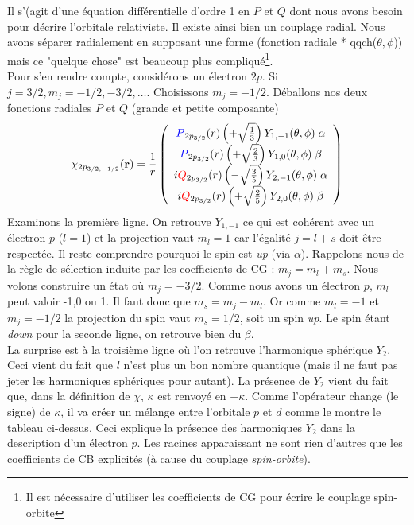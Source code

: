 Il s'(agit d'une équation différentielle d'ordre 1 en $P$ et $Q$ dont nous avons besoin pour
décrire l'orbitale relativiste. Il existe ainsi bien un couplage radial. Nous avons séparer radialement en supposant une forme (fonction radiale * qqch($\theta,\phi$)) mais ce "quelque chose"
est beaucoup plus compliqué\footnote{Il est nécessaire d'utiliser les coefficients de CG pour écrire
le couplage spin-orbite}.\\
 
Pour s'en rendre compte, considérons un électron $2p$. Si $j=3/2, m_j = -1/2,-3/2,\dots$. Choisissons
$m_j = -1/2$. Déballons nos deux fonctions radiales $P$ et $Q$ (grande et petite composante)
\begin{equation}
\chi_{2p_{{3/2}, -1/2}} ({\bf r}) =\frac{1}{r} \left( \begin{array}{c}
 {\color{blue} P}_{2p_{3/2} }(r) \left(   +\sqrt{\frac{1}{3} } \right) Y_{1,-1} (\theta, \phi)\;  \alpha \\ 
 {\color{blue} P}_{2p_{3/2} }(r) \left(   +\sqrt{\frac{2}{3} } \right) Y_{1,0} (\theta, \phi)\;  \beta \\ 
 i {\color{red} Q}_{2p_{3/2} } (r) \left(   -\sqrt{\frac{3}{5} } \right) Y_{2,-1} (\theta, \phi)\;  \alpha  \\
  i {\color{red} Q}_{2p_{3/2} } (r)  \left(  + \sqrt{\frac{2}{5} } \right) Y_{2,0} (\theta, \phi)\;  \beta \end{array} \right)
\end{equation}
Examinons la première ligne. On retrouve $Y_{1,-1}$ ce qui est cohérent avec un électron $p$ ($l=1$)
et la projection vaut $m_l=1$ car l'égalité $j=l+s$ doit être respectée. Il reste comprendre pourquoi
le spin est \textit{up} (via $\alpha$). Rappelons-nous de la règle de sélection induite par les
coefficients de CG : $m_j=m_l+m_s$. Nous volons construire un état où $m_j = -3/2$. Comme nous avons
un électron $p$, $m_l$ peut valoir -1,0 ou 1. Il faut donc que $m_s=m_j-m_l$. Or comme $m_l=-1$ et 
$m_j=-1/2$ la projection du spin vaut $m_s=1/2$, soit un spin \textit{up}. Le spin étant \textit{down}
pour la seconde ligne, on retrouve bien du $\beta$.\\

La surprise est à la troisième ligne où l'on retrouve l'harmonique sphérique $Y_2$. Ceci vient du fait
que $l$ n'est plus un bon nombre quantique (mais il ne faut pas jeter les harmoniques sphériques pour
autant). La présence de $Y_2$ vient du fait que, dans la définition de $\chi$, $\kappa$ est renvoyé
en $-\kappa$.  Comme l'opérateur change (le signe) de $\kappa$, il va créer un mélange entre 
l'orbitale $p$ et $d$ comme le montre le tableau ci-dessus. Ceci explique la présence des harmoniques
$Y_2$ dans la description d'un électron $p$. Les racines apparaissant ne sont rien d'autres que les
coefficients de CB explicités (à cause du couplage \textit{spin-orbite}).



